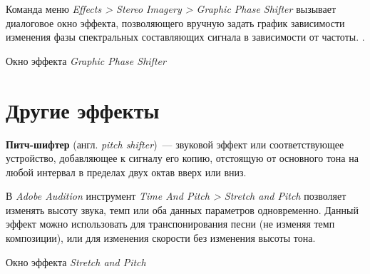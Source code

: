 \documentclass{beamer}
\begin{document}
\begin{frame}
  Команда меню \textit{Effects > Stereo Imagery > Graphic Phase Shifter} вызывает диалоговое окно эффекта, позволяющего вручную задать график зависимости изменения фазы спектральных составляющих сигнала в зависимости от частоты.
.

  \begin{block}{Окно эффекта \emph{Graphic Phase Shifter}}
  \end{block}
\end{frame}

\section{Другие эффекты}
\begin{frame}
  \textbf{Питч-шифтер} (англ. \textit{pitch shifter})~--- звуковой эффект или соответствующее устройство, добавляющее к сигналу его копию, отстоящую от основного тона на любой интервал в пределах двух октав вверх или вниз.

  В \emph{Adobe Audition} инструмент \textit{Time And Pitch > Stretch and Pitch} позволяет изменять высоту звука, темп или оба данных параметров одновременно. Данный эффект можно использовать для транспонирования песни (не изменяя темп композиции), или для изменения скорости без изменения высоты тона.

  \begin{block}{Окно эффекта \emph{Stretch and Pitch}}
  \end{block}
\end{frame}
\end{document}
